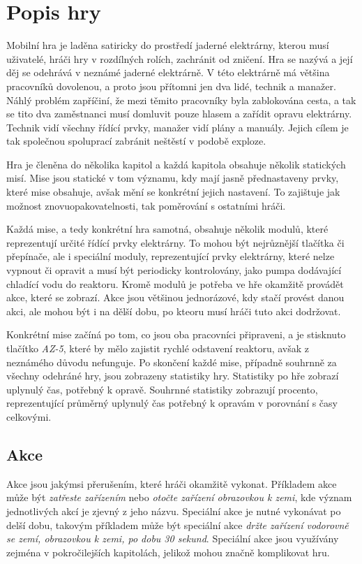 \section{Popis hry}

Mobilní hra je laděna satiricky do prostředí jaderné elektrárny,
kterou musí uživatelé,
hráči hry v rozdílných rolích,
zachránit od zničení.
Hra se nazývá \emph{\myAppName}
a její děj se odehrává v neznámé jaderné elektrárně.
V této elektrárně má většina pracovníků dovolenou,
a proto jsou přítomni jen dva lidé,
technik a manažer.
Náhlý problém zapříčiní,
že mezi těmito pracovníky byla zablokována cesta,
a tak se tito dva zaměstnanci musí domluvit pouze hlasem
a zařídit opravu elektrárny.
Technik vidí všechny řídící prvky,
manažer vidí plány a manuály.
Jejich cílem je tak společnou spoluprací zabránit neštěstí v podobě exploze. 

Hra je členěna do několika kapitol
a každá kapitola obsahuje několik statických misí.
Mise jsou statické v tom významu,
kdy mají jasně přednastaveny prvky,
které mise obsahuje,
avšak mění se konkrétní jejich nastavení.
To zajištuje jak možnost znovuopakovatelnosti,
tak poměrování s ostatními hráči.

Každá mise,
a tedy konkrétní hra samotná,
obsahuje několik modulů,
které reprezentují určité řídící prvky elektrárny.
To mohou být nejrůznější tlačítka či přepínače,
ale i speciální moduly,
reprezentující prvky elektrárny,
které nelze vypnout či opravit a musí být periodicky kontrolovány,
jako pumpa dodávající chladící vodu do reaktoru.
Kromě modulů je potřeba ve hře okamžitě provádět akce,
které se zobrazí.
Akce jsou většinou jednorázové,
kdy stačí provést danou akci,
ale mohou být i na dělší dobu,
po kteoru musí hráči tuto akci dodržovat.

Konkrétní mise začíná po tom,
co jsou oba pracovníci připraveni,
a je stisknuto tlačítko \emph{AZ-5},
které by mělo zajistit rychlé odstavení reaktoru,
avšak z neznámého důvodu nefunguje.
Po skončení každé mise,
případně souhrnně za všechny odehráné hry,
jsou zobrazeny statistiky hry.
Statistiky po hře zobrazí uplynulý čas,
potřebný k opravě.
Souhrnné statistiky zobrazují procento,
reprezentující průměrný uplynulý čas potřebný k opravám
v porovnání s časy celkovými.

\subsection{Akce}

Akce jsou jakýmsi přerušením,
které hráči okamžitě vykonat.
Příkladem akce může být \emph{zatřeste zařízením} nebo
\emph{otočte zařízení obrazovkou k zemi},
kde význam jednotlivých akcí je zjevný z jeho názvu.
Speciální akce je nutné vykonávat po delší dobu,
takovým příkladem může být speciální akce
\emph{držte zařízení vodorovně se zemí, obrazovkou k zemi, po dobu 30 sekund}.
Speciální akce jsou využívány zejména v pokročilejších kapitolách,
jelikož mohou značně komplikovat hru.

